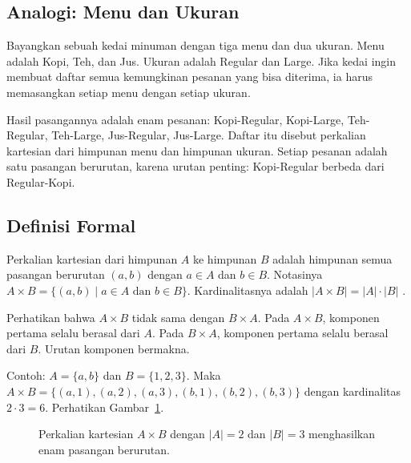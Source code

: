 \documentclass[11pt,a4paper]{article}
\begin{document}
\subsection{Analogi: Menu dan Ukuran}

Bayangkan sebuah kedai minuman dengan tiga menu dan dua ukuran. Menu adalah Kopi, Teh, dan Jus. Ukuran adalah Regular dan Large. Jika kedai ingin membuat daftar semua kemungkinan pesanan yang bisa diterima, ia harus memasangkan setiap menu dengan setiap ukuran.

Hasil pasangannya adalah enam pesanan: Kopi-Regular, Kopi-Large, Teh-Regular, Teh-Large, Jus-Regular, Jus-Large. Daftar itu disebut perkalian kartesian dari himpunan menu dan himpunan ukuran. Setiap pesanan adalah satu pasangan berurutan, karena urutan penting: Kopi-Regular berbeda dari Regular-Kopi.

\subsection{Definisi Formal}

Perkalian kartesian dari himpunan $A$ ke himpunan $B$ adalah himpunan semua pasangan berurutan $(a,b)$ dengan $a \in A$ dan $b \in B$. Notasinya $A \times B=\{(a,b) \mid a \in A \text{ dan } b \in B\}$. Kardinalitasnya adalah $|A \times B|=|A| \cdot |B|$ \cite{rosen}.

Perhatikan bahwa $A \times B$ tidak sama dengan $B \times A$. Pada $A \times B$, komponen pertama selalu berasal dari $A$. Pada $B \times A$, komponen pertama selalu berasal dari $B$. Urutan komponen bermakna.

Contoh: $A=\{a,b\}$ dan $B=\{1,2,3\}$. Maka $A \times B=\{(a,1),(a,2),(a,3),(b,1),(b,2),(b,3)\}$ dengan kardinalitas $2 \cdot 3=6$. Perhatikan Gambar~\ref{fig:kartesian}.

\begin{figure}[H]
	\centering
	\caption{Perkalian kartesian $A \times B$ dengan $|A|=2$ dan $|B|=3$ menghasilkan enam pasangan berurutan.}
	\label{fig:kartesian}
\end{figure}
\end{document}
